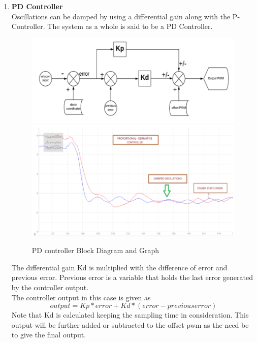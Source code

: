 \begin{enumerate}
    \item \textbf{PD Controller}\\
    Oscillations can be damped by using a differential gain along with the P-Controller. The system as a whole is said to be a PD Controller.
    \begin{figure}[H]
        \centering
        \includegraphics[width=0.8\linewidth]{SummerInterReport/project/Images-Major/dblock.png}
        \includegraphics[width=0.8\linewidth]{SummerInterReport/project/Images-Major/dgraph.png}
        \caption{PD controller Block Diagram and Graph}
        \label{fig:PDcontroller}
    \end{figure}
    The differential gain Kd is multiplied with the difference of error and previous error. Previous error is a variable that holds the last error generated by the controller output.\\
    The controller output in this case is given as
    \begin{equation}
        output = Kp * error + Kd * (error - previous error)
    \end{equation}
    Note that Kd is calculated keeping the sampling time in consideration. This output will be further added or subtracted to the offset pwm as the need be to give the final output.
    

\end{enumerate}
